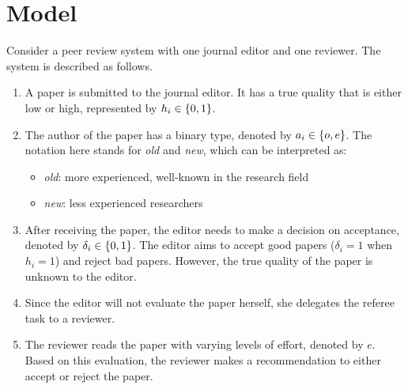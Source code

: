 \documentclass[12pt]{article}
\begin{document}
\section{Model} \label{sec:model}
Consider a peer review system with one journal editor and one reviewer. The
system is described as follows.

\begin{enumerate}
    \item A paper is submitted to the journal editor. It has a true quality that is
          either low or high, represented by $h_i \in \left\{0,1\right\}$.

    \item The author of the paper has a binary type, denoted by $a_i \in \left\{o,e\right\}$. The
          notation here stands for \textit{old} and \textit{new}, which can be
          interpreted as:
          \begin{itemize}
              \item \textit{old}: more experienced, well-known in the research field
              \item \textit{new}: less experienced researchers
          \end{itemize}

    \item After receiving the paper, the editor needs to make a decision on acceptance,
          denoted by $\delta_i \in \left\{0,1\right\}$. The editor aims to accept good papers
          ($\delta_i = 1$ when $h_i = 1$) and reject bad papers. However, the true
          quality of the paper is unknown to the editor.

    \item Since the editor will not evaluate the paper herself, she delegates the referee
          task to a reviewer.

    \item The reviewer reads the paper with varying levels of effort, denoted by $e$.
          Based on this evaluation, the reviewer makes a recommendation to either accept
          or reject the paper.


\end{enumerate}
\end{document}

